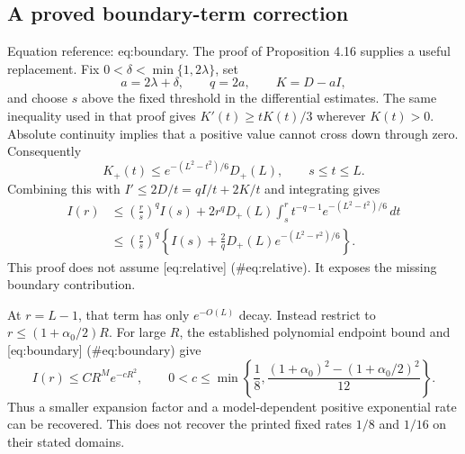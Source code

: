 \documentclass[10pt]{article}
\begin{document}
\subsection*{A proved boundary-term correction}
Equation reference: eq:boundary. The proof of Proposition 4.16 supplies a useful replacement. Fix \(0<\delta<\min\{1,2\lambda\}\), set \[a=2\lambda+\delta,\qquad q=2a,\qquad K=D-aI,\] and choose \(s\) above the fixed threshold in the differential estimates. The same inequality used in that proof gives \(K'(t)\ge tK(t)/3\) wherever \(K(t)>0\). Absolute continuity implies that a positive value cannot cross down through zero. Consequently \[K_+(t)\le e^{-(L^2-t^2)/6}D_+(L),\qquad s\le t\le L.\] Combining this with \(I'\le2D/t=qI/t+2K/t\) and integrating gives \[\begin{aligned}
 I(r)&\le \left(\frac rs\right)^q I(s)
 +2r^q D_+(L)\int_s^r
       t^{-q-1}e^{-(L^2-t^2)/6}\,dt\\
 &\le \left(\frac rs\right)^q
 \left\{I(s)+\frac2qD_+(L)e^{-(L^2-r^2)/6}\right\}.
 \end{aligned}\] This proof does not assume [eq:relative] (\#eq:relative). It exposes the missing boundary contribution.\par
At \(r=L-1\), that term has only \(e^{-O(L)}\) decay. Instead restrict to \(r\le(1+\alpha_0/2)R\). For large \(R\), the established polynomial endpoint bound and [eq:boundary] (\#eq:boundary) give \[I(r)\le CR^M e^{-cR^2},\qquad
 0<c\le\min\!\left\{\frac18,
 \frac{(1+\alpha_0)^2-(1+\alpha_0/2)^2}{12}\right\}.\] Thus a smaller expansion factor and a model-dependent positive exponential rate can be recovered. This does not recover the printed fixed rates \(1/8\) and \(1/16\) on their stated domains.\par
\end{document}
